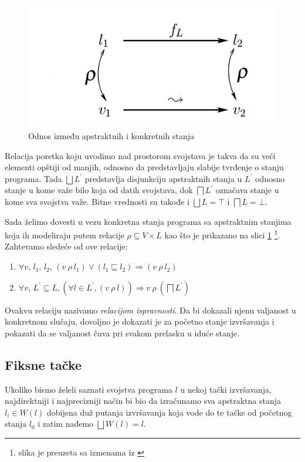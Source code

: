 \begin{figure}
\begin{center}
\includegraphics[scale=0.5]{Rho.png}
\end{center}
\caption{Odnos između apstraktnih i konkretnih stanja}
\label{fig:Rho}
\end{figure}

Relacija poretka koju uvodimo nad prostorom svojstava je takva da su veći elementi opštiji od manjih, odnosno da predstavljaju slabije tvrđenje o stanju programa. Tada $\bigsqcup L^{\prime}$ predstavlja disjunkciju apstraktnih stanja u $L^{\prime}$ odnosno stanje u kome važe bilo koja od datih svojstava, dok $\bigsqcap L^{\prime}$ označava stanje u kome sva svojstva važe. Bitne vrednosti su takođe i $\bigsqcup L = \top$ i $\bigsqcap L = \bot$.

Sada želimo dovesti u vezu konkretna stanja programa sa apstraktnim stanjima koja ih modeliraju putem relacije $\rho \subseteq V \times L$ kao što je prikazano na slici \ref{fig:Rho} \footnote{slika je preuzeta sa izmenama iz \cite{salcianu}}. Zahtevamo sledeće od ove relacije:
\begin{enumerate}
\item $\forall v,\, l_{1},\, l_{2},\, (v\: \rho \: l_{1}) \vee (l_{1} \sqsubseteq l_{2}) \Rightarrow (v\: \rho \: l_{2})$
\item $\forall v,\, L^{\prime} \subseteq L, (\forall l \in L^{\prime}, 	(v\: \rho \: l)) \Rightarrow v\: \rho \: (\bigsqcap L^{\prime})$
\end{enumerate}

Ovakvu relaciju nazivamo \emph{relacijom ispravnosti}. Da bi dokazali njenu valjanost u konkretnom slučaju, dovoljno je dokazati je za početno stanje izvršavanja i pokazati da se valjanost čuva pri svakom prelasku u iduće stanje. 


\subsection{Fiksne tačke}
Ukoliko bismo želeli saznati svojstva programa $l$ u nekoj tački izvršavanja, najdirektniji i najprecizniji način bi bio da izračunamo sva apstraktna stanja $l_{i} \in W(l)$ dobijena duž putanja izvršavanja koja vode do te tačke od početnog stanja $l_{0}$ i zatim nađemo $\bigsqcup W(l) = l$. 

